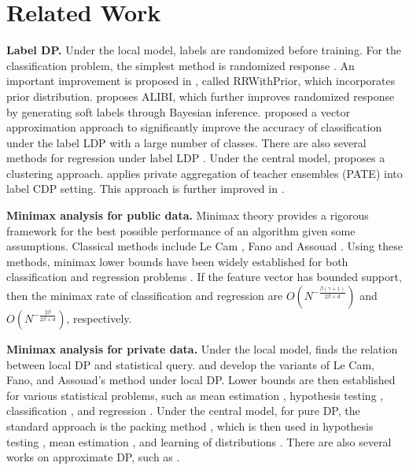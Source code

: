 \section{Related Work}
\label{sec:related}
\textbf{Label DP.} Under the local model, labels are randomized before training. For the classification problem, the simplest method is randomized response \citep{warner1965randomized}. An important improvement is proposed in \citep{ghazi2021deep}, called RRWithPrior, which incorporates prior distribution. \citep{malek2021antipodes} proposes ALIBI, which further improves randomized response by generating soft labels through Bayesian inference. \citep{zhao2024enhancing} proposed a vector approximation approach to significantly improve the accuracy of classification under the label LDP with a large number of classes. There are also several methods for regression under label LDP \citep{ghazi2022regression,badanidiyuru2023optimal}. Under the central model, \citep{esfandiari2022label} proposes a clustering approach. \citep{malek2021antipodes} applies private aggregation of teacher ensembles (PATE) \citep{papernot2017semi} into label CDP setting. This approach is further improved in \citep{tang2022machine}.

\textbf{Minimax analysis for public data.} Minimax theory provides a rigorous framework for the best possible performance of an algorithm given some assumptions. Classical methods include Le Cam \citep{lecam1973convergence}, Fano \citep{verdu1994generalizing} and Assouad \citep{assouad1983deux}. Using these methods, minimax lower bounds have been widely established for both classification and regression problems \citep{yang1999minimax,yang1999minimax2,audibert2007fast,tsybakov2009introduction,chaudhuri2014rates,yang2015minimax,doring2018rate,gadat2016classification,zhao2019minimax,zhao2021minimax}. If the feature vector has bounded support, then the minimax rate of classification and regression are $O(N^{-\frac{\beta(\gamma+1)}{2\beta+d}})$ and $O(N^{-\frac{2\beta}{2\beta+d}})$, respectively.

\textbf{Minimax analysis for private data.} Under the local model, \citep{kasiviswanathan2011can} finds the relation between local DP and statistical query. \citep{duchi2013local} and \citep{duchi2018minimax} develop the variants of Le Cam, Fano, and Assouad's method under local DP. Lower bounds are then established for various statistical problems, such as mean estimation \citep{li2023robustness,feldman2020private,duchi2019lower,huang2021instance}, hypothesis testing \cite{gopi2020locally}, classification \citep{berrett2019classification}, and regression \citep{berrett2021strongly}. Under the central model, for pure DP, the standard approach is the packing method \citep{hardt2010geometry}, which is then used in hypothesis testing \citep{bun2019private}, mean estimation \citep{narayanan2023better,kamath2020private}, and learning of distributions \citep{kamath2019privately,alabi2023privately,arbas2023polynomial}. There are also several works on approximate DP, such as \citep{bun2014fingerprinting,kamath2022new}. 

